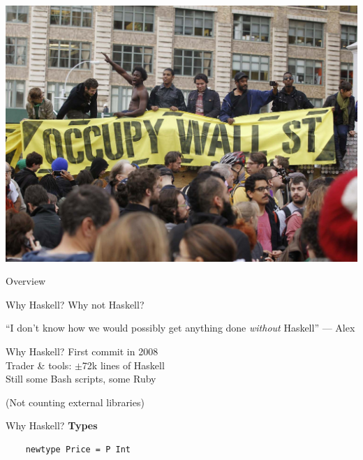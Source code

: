 \documentclass[20pt]{beamer}
\newcommand{\vspaced}{
    \vspace{5mm}
}
\begin{document}
\begin{frame}[plain]
    \includegraphics[width=\textwidth]{images/finance.jpg}
\end{frame}


\begin{frame}{Overview}
\end{frame}

\begin{frame}{Why Haskell?}
    \large{Why not Haskell?}
\end{frame}

\begin{frame}
    ``I don't know how we would possibly get anything done
    \emph{without} Haskell'' --- Alex
\end{frame}

\begin{frame}{Why Haskell?}
    First commit in 2008 \\
    Trader \& tools: $\pm$72k lines of Haskell \\
    Still some Bash scripts, some Ruby \\
    \vspaced
    (Not counting external libraries) \\
\end{frame}

\begin{frame}[fragile]{Why Haskell?}
    \textbf{Types} \\
    \vspaced
    \begin{lstlisting}
    newtype Price = P Int
    \end{lstlisting}
\end{frame}
\end{document}
